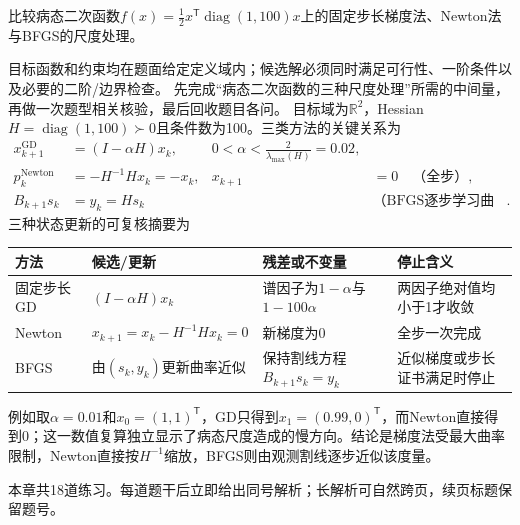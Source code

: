 \label{struct:V1-C08-CH11}
\begin{example}[病态二次函数的三种尺度处理]\label{exm:V1-C08-preconditioning}
比较病态二次函数$f(x)=\tfrac12x^{\mathsf T}\operatorname{diag}(1,100)x$上的固定步长梯度法、Newton法与BFGS的尺度处理。
\end{example}
\begin{solution}
\SolGiven 目标函数和约束均在题面给定定义域内；候选解必须同时满足可行性、一阶条件以及必要的二阶/边界检查。
\SolPlan 先完成“病态二次函数的三种尺度处理”所需的中间量，再做一次题型相关核验，最后回收题目各问。
\SolDerive
目标域为$\mathbb R^2$，Hessian$H=\operatorname{diag}(1,100)\succ0$且条件数为100。三类方法的关键关系为
\[
\begin{aligned}
x_{k+1}^{\mathrm{GD}}&=(I-\alpha H)x_k,
&0<\alpha<\frac{2}{\lambda_{\max}(H)}=0.02,\\
p_k^{\mathrm{Newton}}&=-H^{-1}Hx_k=-x_k,
&x_{k+1}&=0\quad\text{（全步）},\\
B_{k+1}s_k&=y_k=Hs_k
&&\text{（BFGS逐步学习曲率尺度）}.
\end{aligned}
\]
三种状态更新的可复核摘要为
\begin{center}
\begin{tabularx}{\linewidth}{@{}l X X X@{}}
\toprule
方法 & 候选/更新 & 残差或不变量 & 停止含义\\
\midrule
固定步长GD & $(I-\alpha H)x_k$ & 谱因子为$1-\alpha$与$1-100\alpha$ & 两因子绝对值均小于1才收敛\\
Newton & $x_{k+1}=x_k-H^{-1}Hx_k=0$ & 新梯度为0 & 全步一次完成\\
BFGS & 由$(s_k,y_k)$更新曲率近似 & 保持割线方程$B_{k+1}s_k=y_k$ & 近似梯度或步长证书满足时停止\\
\bottomrule
\end{tabularx}
\end{center}
例如取$\alpha=0.01$和$x_0=(1,1)^{\mathsf T}$，GD只得到$x_1=(0.99,0)^{\mathsf T}$，而Newton直接得到$0$；这一数值复算独立显示了病态尺度造成的慢方向。结论是梯度法受最大曲率限制，Newton直接按$H^{-1}$缩放，BFGS则由观测割线逐步近似该度量。
\end{solution}

\begin{chapterexercisebox}
\label{struct:V1-C08-CH34}
\label{struct:V1-C08-CH35}
本章共18道练习。每道题干后立即给出同号解析；长解析可自然跨页，续页标题保留题号。
\end{chapterexercisebox}

